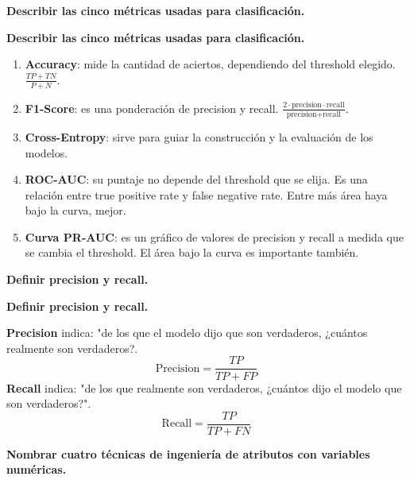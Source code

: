 \documentclass[10pt]{memoir}
\begin{document}
\clearpage
\begin{center}
	\textbf{\Large Describir las cinco métricas usadas para clasificación.} \\
\end{center}

\clearpage
\begin{center}
	\textbf{\Large Describir las cinco métricas usadas para clasificación.} \\
\end{center}
\begin{enumerate}
	\item \textbf{Accuracy}: mide la cantidad de aciertos, dependiendo del threshold elegido. \(\frac{TP+TN}{P+N}\).
	\item \textbf{F1-Score}: es una ponderación de precision y recall. \(\frac{2 \cdot \text{precision} \cdot \text{recall}}{\text{precision} + \text{recall}}\).
	\item \textbf{Cross-Entropy}: sirve para guiar la construcción y la evaluación de los modelos.
	\item \textbf{ROC-AUC}: su puntaje no depende del threshold que se elija. Es una relación entre true positive rate y false negative rate. Entre más área haya bajo la curva, mejor.
	\item \textbf{Curva PR-AUC}: es un gráfico de valores de precision y recall a medida que se cambia el threshold. El área bajo la curva es importante también.
\end{enumerate}

\clearpage
\begin{center}
	\textbf{\Large Definir precision y recall.} \\
\end{center}

\clearpage
\begin{center}
	\textbf{\Large Definir precision y recall.} \\
\end{center}
\noindent \textbf{Precision} indica: "de los que el modelo dijo que son verdaderos, ¿cuántos realmente son verdaderos?. \[\text{Precision} = \frac{TP}{TP+FP}\]
\noindent \textbf{Recall} indica: "de los que realmente son verdaderos, ¿cuántos dijo el modelo que son verdaderos?". \[\text{Recall} = \frac{TP}{TP+FN}\]

\clearpage
\begin{center}
	\textbf{\Large Nombrar cuatro técnicas de ingeniería de atributos con variables numéricas.} \\
\end{center}
\end{document}
